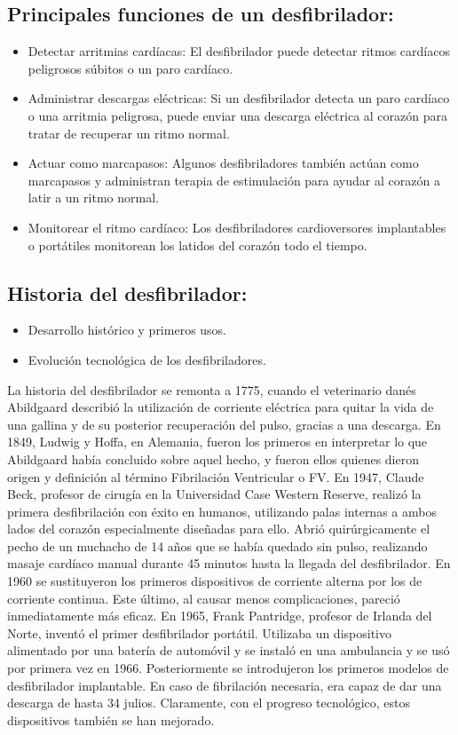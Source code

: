 \subsection{Principales funciones de un desfibrilador:}
\begin{itemize}
    \item Detectar arritmias cardíacas: El desfibrilador puede detectar ritmos cardíacos peligrosos súbitos o un paro cardíaco.
    \item Administrar descargas eléctricas: Si un desfibrilador detecta un paro cardíaco o una arritmia peligrosa, puede enviar una descarga eléctrica al corazón para tratar de recuperar un ritmo normal.
    \item Actuar como marcapasos: Algunos desfibriladores también actúan como marcapasos y administran terapia de estimulación para ayudar al corazón a latir a un ritmo normal.
    \item Monitorear el ritmo cardíaco: Los desfibriladores cardioversores implantables o portátiles monitorean los latidos del corazón todo el tiempo.
\end{itemize}

\subsection{Historia del desfibrilador:}
\begin{itemize}
    \item Desarrollo histórico y primeros usos.
    \item Evolución tecnológica de los desfibriladores.
\end{itemize}

La historia del desfibrilador se remonta a 1775, cuando el veterinario danés Abildgaard describió la utilización de corriente eléctrica para quitar la vida de una gallina y de su posterior recuperación del pulso, gracias a una descarga. En 1849, Ludwig y Hoffa, en Alemania, fueron los primeros en interpretar lo que Abildgaard había concluido sobre aquel hecho, y fueron ellos quienes dieron origen y definición al término Fibrilación Ventricular o FV. En 1947, Claude Beck, profesor de cirugía en la Universidad Case Western Reserve, realizó la primera desfibrilación con éxito en humanos, utilizando palas internas a ambos lados del corazón especialmente diseñadas para ello. Abrió quirúrgicamente el pecho de un muchacho de 14 años que se había quedado sin pulso, realizando masaje cardíaco manual durante 45 minutos hasta la llegada del desfibrilador. \newline \hfill \break
En 1960 se sustituyeron los primeros dispositivos de corriente alterna por los de corriente continua. Este último, al causar menos complicaciones, pareció inmediatamente más eficaz. En 1965, Frank Pantridge, profesor de Irlanda del Norte, inventó el primer desfibrilador portátil. Utilizaba un dispositivo alimentado por una batería de automóvil y se instaló en una ambulancia y se usó por primera vez en 1966. Posteriormente se introdujeron los primeros modelos de desfibrilador implantable. En caso de fibrilación necesaria, era capaz de dar una descarga de hasta 34 julios. Claramente, con el progreso tecnológico, estos dispositivos también se han mejorado.

